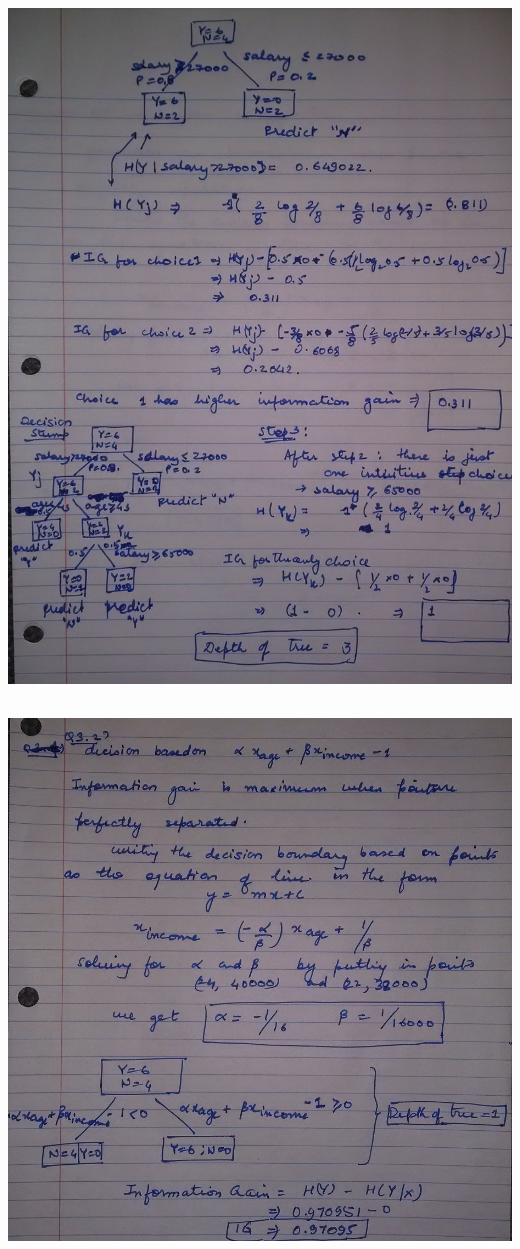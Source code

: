 \documentclass[letterpaper]{article}
\begin{document}
\begin{center}
\includegraphics[width = 6in]{14.png}
\end{center}
\subsection{}
\begin{center}
\includegraphics[width = 6in]{15.png}
\end{center}
\end{document}
